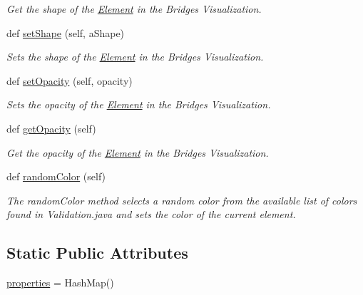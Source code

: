 \begin{DoxyCompactItemize}
\begin{DoxyCompactList}\small\item\em Get the shape of the \hyperlink{namespace_element}{Element} in the Bridges Visualization. \end{DoxyCompactList}\item 
def \hyperlink{class_element_visualizer_1_1_element_visualizer_aee33522cc2e7dccf6471ba0fb6b8066d}{set\+Shape} (self, a\+Shape)
\begin{DoxyCompactList}\small\item\em Sets the shape of the \hyperlink{namespace_element}{Element} in the Bridges Visualization. \end{DoxyCompactList}\item 
def \hyperlink{class_element_visualizer_1_1_element_visualizer_aea9cae4dc99c63ee017ad1b7becd36fb}{set\+Opacity} (self, opacity)
\begin{DoxyCompactList}\small\item\em Sets the opacity of the \hyperlink{namespace_element}{Element} in the Bridges Visualization. \end{DoxyCompactList}\item 
def \hyperlink{class_element_visualizer_1_1_element_visualizer_a5ca091e52fb9ef498b08a63b783aa51d}{get\+Opacity} (self)
\begin{DoxyCompactList}\small\item\em Get the opacity of the \hyperlink{namespace_element}{Element} in the Bridges Visualization. \end{DoxyCompactList}\item 
def \hyperlink{class_element_visualizer_1_1_element_visualizer_ad128c758217718b95114a033e33824cf}{random\+Color} (self)
\begin{DoxyCompactList}\small\item\em The random\+Color method selects a random color from the available list of colors found in Validation.\+java and sets the color of the current element. \end{DoxyCompactList}\end{DoxyCompactItemize}
\subsection*{Static Public Attributes}
\begin{DoxyCompactItemize}
\item 
\hyperlink{class_element_visualizer_1_1_element_visualizer_a2c7c4e30a547a0269a4b918794068985}{properties} = Hash\+Map()
\end{DoxyCompactItemize}


